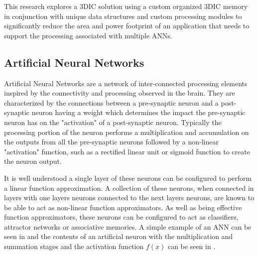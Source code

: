This research explores a 3DIC solution using a custom organized 3DIC memory in conjunction with unique data structures and custom processing modules to significantly reduce the 
area and power footprint of an application that needs to support the processing associated with multiple ANNs.


\subsection*{Artificial Neural Networks}
\label{sec:Artificial Neural Networks}

Artificial Neural Networks are a network of inter-connected processing elements inspired by the 
connectivity and processing observed in the brain.
They are characterized by the connections between a pre-synaptic neuron and a post-synaptic
neuron having a weight which determines the impact the pre-synaptic neuron has on the 
"activation" of a post-synaptic neuron.
Typically the processing portion of the neuron performs a multiplication and accumulation on the outputs from all
the pre-synaptic neurons followed by a non-linear "activation" function, such as a rectified linear unit or sigmoid function to create the neuron output.

It is well understood a single layer of these neurons can be configured to perform a linear function approximation.
A collection of these neurons, when connected in layers with one layers neurons connected to
the next layers neurons, are known to be able to act as non-linear function approximators.
As well as being effective function approximators, these neurons can be configured to act as 
classifiers, attractor networks or associative memories.
A simple example of an ANN can be seen in  and the contents of an artificial neuron 
with the multiplication and summation stages and the activation function $f(x)$ can be seen in . 


